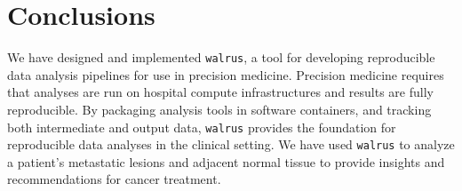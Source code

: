 \section{Conclusions} 
We have designed and implemented \texttt{walrus}, a tool for developing 
reproducible data analysis pipelines for use in precision medicine. Precision
medicine requires that analyses are run on hospital compute infrastructures and
results are fully reproducible. By packaging analysis tools in software
containers, and tracking both intermediate and output data, \texttt{walrus}
provides the foundation for reproducible data analyses in the clinical setting.
We have used \texttt{walrus} to analyze a patient's metastatic lesions and
adjacent normal tissue to provide insights and recommendations for  cancer
treatment. 
